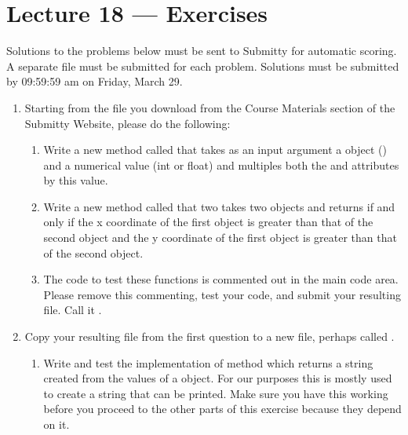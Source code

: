 \documentclass[letterpaper,10pt,english]{sphinxmanual}
\begin{document}
\chapter{Lecture 18 — Exercises}
\label{\detokenize{lecture_notes/lec18_classes1_exercises/exercises:lecture-18-exercises}}\label{\detokenize{lecture_notes/lec18_classes1_exercises/exercises::doc}}
Solutions to the problems below must be sent to Submitty for
automatic scoring.  A separate file must be submitted for each problem.
Solutions must be submitted by 09:59:59 am on Friday, March 29.
\begin{enumerate}
\def\theenumi{\arabic{enumi}}
\def\labelenumi{\theenumi .}
\makeatletter\def\p@enumii{\p@enumi \theenumi .}\makeatother
\item {} 
Starting from the  file you download from the
Course Materials section of the Submitty Website, please do the following:
\begin{enumerate}
\def\theenumii{\arabic{enumii}}
\def\labelenumii{\theenumii .}
\makeatletter\def\p@enumiii{\p@enumii \theenumii .}\makeatother
\item {} 
Write a new  method called  that takes as an
input argument a  object () and a numerical
value (int or float) and multiples both the  and 
attributes by this value.

\item {} 
Write a new  method called  that two
takes two  objects and returns  if and only
if the x coordinate of the first object is greater than that of
the second object and the y coordinate of the first object is
greater than that of the second object.

\item {} 
The code to test these functions is commented out in the main
code area. Please remove this commenting, test your code, and
submit your resulting  file.  Call it .

\end{enumerate}

\item {} 
Copy your resulting file from the first question to a new file,
perhaps called .
\begin{enumerate}
\def\theenumii{\arabic{enumii}}
\def\labelenumii{\theenumii .}
\makeatletter\def\p@enumiii{\p@enumii \theenumii .}\makeatother
\item {} 
Write and test the implementation of method 
which returns a string created from the values of a 
object. For our purposes this is mostly used to create a string
that can be printed. Make sure you have this working before
you proceed to the other parts of this exercise because they
depend on it.


\end{enumerate}
\end{enumerate}
\end{document}
